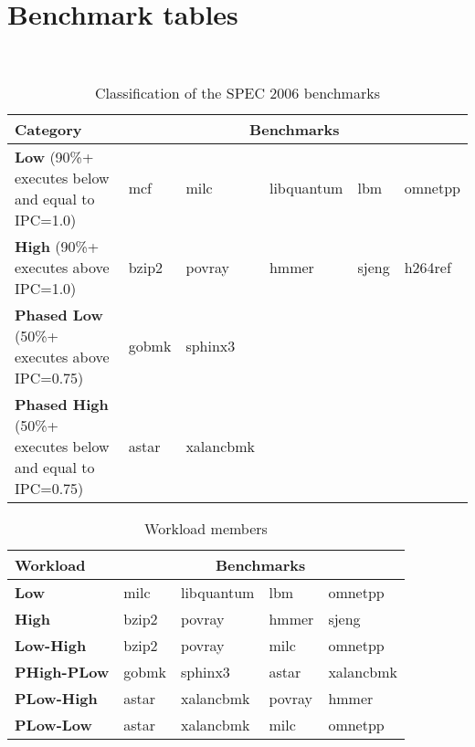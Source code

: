 \chapter{Benchmark tables}~\label{app:benchmark}

\begin{table}[h!]
 \begin{center}
\begin{tabular}{| p{1in} | l | l | l | l | l |}
\hline	
Category & \multicolumn{5}{|c|}{Benchmarks} \\
\hline
\hline
\textbf{Low} (90\%+ executes below and equal to IPC=1.0) & mcf & milc & libquantum & lbm & omnetpp \\
\hline
\textbf{High} (90\%+ executes above IPC=1.0) & bzip2 & povray & hmmer & sjeng & h264ref \\
\hline
\textbf{Phased Low} (50\%+ executes above IPC=0.75) & gobmk & sphinx3 & & & \\
\hline
\textbf{Phased High} (50\%+ executes below and equal to IPC=0.75) & astar & xalancbmk & & & \\
\hline  
\end{tabular}
 \end{center}
\caption{Classification of the SPEC 2006 benchmarks}
\label{tab:spec_classification}
\end{table}

\begin{table}[h!]
 \begin{center}
\begin{tabular}{| l | l | l | l | l |}
\hline
Workload & \multicolumn{4}{|c|}{Benchmarks} \\	
\hline
\hline
\textbf{Low} & milc & libquantum & lbm & omnetpp \\ 
\hline
\textbf{High} & bzip2 & povray & hmmer & sjeng \\ 
\hline
\textbf{Low-High} & bzip2 & povray & milc & omnetpp \\
\hline
\textbf{PHigh-PLow} & gobmk & sphinx3 & astar & xalancbmk \\
\hline
\textbf{PLow-High} & astar & xalancbmk & povray & hmmer \\
\hline
\textbf{PLow-Low} & astar & xalancbmk & milc & omnetpp \\
\hline
\end{tabular} 
 \end{center}
\caption{Workload members}
\label{tab:spec_groups}
\end{table}
